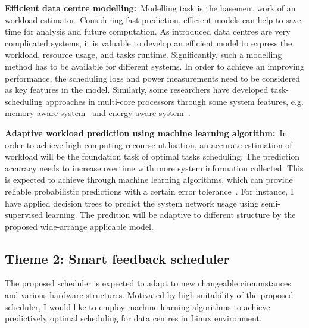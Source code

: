 \textbf{Efficient data centre modelling:}~Modelling task is the basement work of an workload estimator. Considering fast prediction, efficient models can help to save time for analysis and future computation. As introduced data centres are very complicated systems, it is valuable to develop an efficient model to express the workload, resource usage, and tasks runtime. Significantly, such a modelling method has to be available for different systems. In order to achieve an improving performance, the scheduling logs and power measurements need to be considered as key features in the model. Similarly, some researchers have developed task-scheduling approaches in multi-core processors through some system features, e.g. memory aware system~\cite{memaw} and energy aware system~\cite{game}. 

\textbf{Adaptive workload prediction using machine learning algorithm:}~In order to achieve high computing recourse utilisation, an accurate estimation of workload will be the foundation task of optimal tasks scheduling. The prediction accuracy needs to increase overtime with more system information collected. This is expected to achieve through machine learning algorithms, which can provide reliable probabilistic predictions with a certain error tolerance~\cite{ma}. For instance, I have applied decision trees to predict the system network usage using semi-supervised learning. The predition will be adaptive to different structure by the proposed wide-arrange applicable model.
\subsection{Theme 2: Smart feedback scheduler}
The proposed scheduler is expected to adapt to new changeable circumstances and various hardware structures. Motivated by high suitability of the proposed scheduler, I would like to employ machine learning algorithms to achieve predictively optimal scheduling for data centres in Linux environment.

